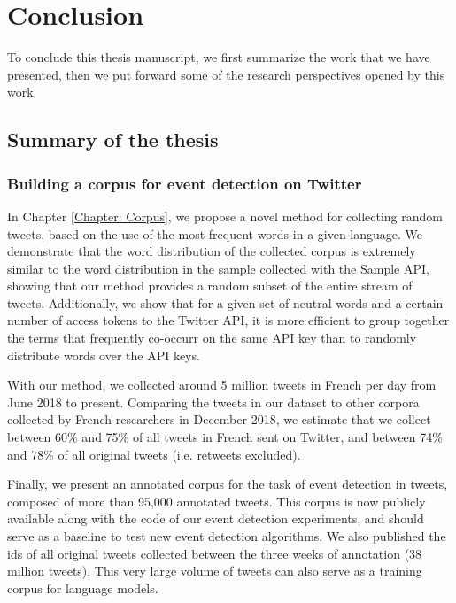 \chapter{Conclusion}

To conclude this thesis manuscript, we first summarize the work that we have presented, then we put forward some of the research perspectives opened by this work.

\section{Summary of the thesis}

\subsection{Building a corpus for event detection on Twitter}
In Chapter \ref{Chapter: Corpus}, we propose a novel method for collecting  random tweets, based on the use of the most frequent words in a given language. We demonstrate that the word distribution of the collected corpus is extremely similar to the word distribution in the sample collected with the Sample API, showing that our method provides a random subset of the entire stream of tweets. Additionally, we show that for a given set of neutral words and a certain number of access tokens to the Twitter API, it is more efficient to group together the terms that frequently co-occurr on the same API key than to randomly distribute words over the API keys. 

With our method, we collected around 5 million tweets in French per day from June 2018 to present. Comparing the tweets in our dataset to other corpora collected by French researchers in December 2018, we estimate that we collect between 60\% and 75\% of all tweets in French sent on Twitter, and between 74\% and 78\% of all original tweets (i.e. retweets excluded). 

Finally, we present an annotated corpus for the task of event detection in tweets, composed of more than 95,000 annotated tweets. This corpus is now publicly available along with the code of our event detection experiments, and should serve as a baseline to test new event detection algorithms. We also published the ids of all original tweets collected between the three weeks of annotation (38 million tweets).  This very large volume of tweets can also serve as a training corpus for language models.


